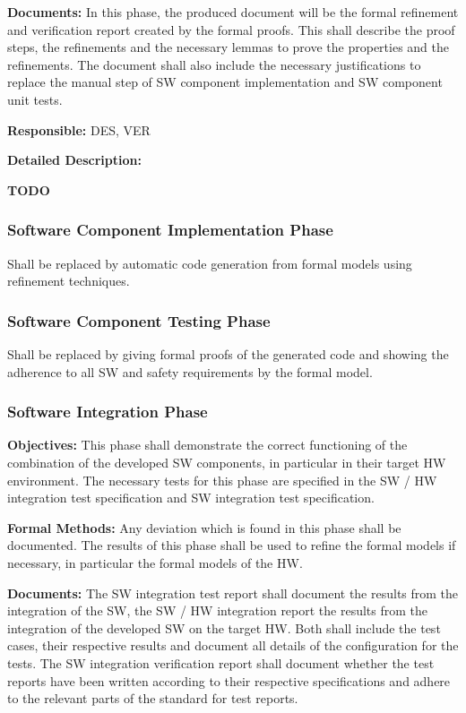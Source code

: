 {\bf Documents:} In this phase, the produced document will be the formal
refinement and verification report created by the formal proofs. This shall
describe the proof steps, the refinements and the necessary lemmas to prove the
properties and the refinements. The document shall also include the necessary
justifications to replace the manual step of SW component implementation and SW
component unit tests.

{\bf Responsible:} DES, VER

{\bf Detailed Description:}

{\Huge \bf TODO}

\subsubsection{Software Component Implementation Phase}
\label{sec:softw-comp-impl}

Shall be replaced by automatic code generation from formal models using
refinement techniques.

\subsubsection{Software Component Testing Phase}
\label{sec:softw-comp-test}

Shall be replaced by giving formal proofs of the generated code and showing the
adherence to all SW and safety requirements by the formal model.

\subsubsection{Software Integration Phase}
\label{sec:softw-integr-phase}

{\bf Objectives:} This phase shall demonstrate the correct functioning of the
combination of the developed SW components, in particular in their target HW
environment. The necessary tests for this phase are specified in the SW / HW
integration test specification and SW integration test specification.

{\bf Formal Methods:} Any deviation which is found in this phase shall be
documented. The results of this phase shall be used to refine the formal models
if necessary, in particular the formal models of the HW.

{\bf Documents:} The SW integration test report shall document the results from
the integration of the SW, the SW / HW integration report the results from the
integration of the developed SW on the target HW. Both shall include the test
cases, their respective results and document all details of the configuration
for the tests. The SW integration verification report shall document whether the
test reports have been written according to their respective specifications and
adhere to the relevant parts of the standard for test reports.


